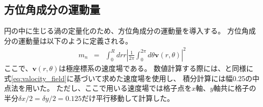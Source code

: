 \documentclass[/Users/ikedahajime/GitHub/reserch/master_report/thesis]{subfiles}
\begin{document}
\subsection{方位角成分の運動量}
円の中に生じる渦の定量化のため、方位角成分の運動量を導入する。
方位角成分の運動量は以下のように定義される。
\begin{eqnarray}
    m_n &=& \int_0^R dr r\left|\frac{1}{2\pi}\int_0^{2\pi}d\theta \bm{v}(r,\theta)\right|^2
\end{eqnarray}
ここで、$\bm{v}(r,\theta)$は極座標系の速度場である。
数値計算する際には、と同様に式\eqref{eq:valocity_field}に基づいて求めた速度場を使用し、
積分計算には幅0.25の中点法を用いた。
ただし、ここで用いる速度場では格子点を$x$軸、$y$軸共に格子の半分$\delta x/2=\delta y/2=0.125$だけ平行移動して計算した。



\ifSubfilesClassLoaded{
    \printbibliography[title=参考文献]
    }{}
\end{document}
